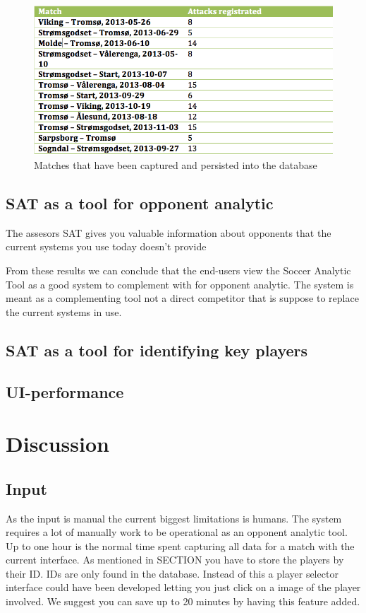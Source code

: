 \begin{figure}[ht!]
\centering
\includegraphics[width=1\textwidth]{images/general/matched_regged.png}
\caption{Matches that have been captured and persisted into the database}
\label{fig:matches_regged}
\end{figure}

\subsection{SAT as a tool for opponent analytic}

The assesors
SAT gives you valuable information about opponents that the current systems you use today doesn't provide

From these results we can conclude that the end-users view the Soccer Analytic Tool as a good system to complement with for opponent analytic. The system is meant as a complementing tool not a direct competitor that is suppose to replace the current systems in use.

\subsection{SAT as a tool for identifying key players}


\subsection{UI-performance}

\section{Discussion}
\subsection{Input}

As the input is manual the current biggest limitations is humans. The system requires a lot of manually work to be operational as an opponent analytic tool. Up to one hour is the normal time spent capturing all data for a match with the current interface. As mentioned in SECTION you have to store the players by their ID. IDs are only found in the database. Instead of this a player selector interface could have been developed letting you just click on a image of the player involved. We suggest you can save up to 20 minutes by having this feature added.

